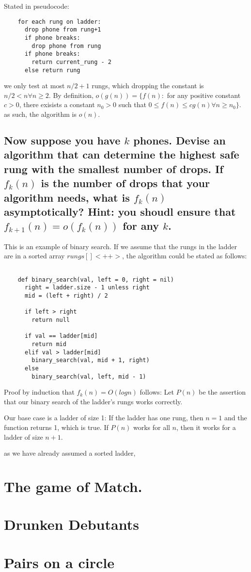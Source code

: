 \documentclass[titlepage]{article}\usepackage[]{graphicx}\usepackage[]{color}
\begin{document}
  Stated in pseudocode:
  \begin{lstlisting}
	for each rung on ladder:
	  drop phone from rung+1
	  if phone breaks:
		drop phone from rung
	  if phone breaks:
		return current_rung - 2
	  else return rung
  \end{lstlisting}
  we only test at most $n/2+1$ rungs, which dropping the constant is $ n/2 < n
  \forall n \geq 2$. 
  By definition, $o(g(n)) = \{ f(n) : $ for any positive constant $c>0$, there
  exisists a constant $n_0 > 0$ such that $0 \leq f(n) \leq cg(n) \forall n \geq n_0\}$.
  as such, the algorithm is $o(n)$. 

\subsection{Now suppose you have $k$ phones. Devise an algorithm that can
  determine the highest safe rung with the smallest number of drops. If
  $f_k(n)$
  is the number of drops that your algorithm needs, what is 
  $f_k(n)$ asymptotically? Hint: you shoudl ensure that 
  $f_{k+1}(n) = o(f_k(n))$ for any $k$.}

  This is an example of binary search. If we assume that the rungs in the
  ladder are in a sorted array $rungs[]<++>$, the algorithm could be stated
  as follows:

  \begin{lstlisting}

	def binary_search(val, left = 0, right = nil)
	  right = ladder.size - 1 unless right
	  mid = (left + right) / 2
 
	  if left > right
	  	return null
   
	  if val == ladder[mid]
		return mid
	  elif val > ladder[mid]
		binary_search(val, mid + 1, right)
	  else
		binary_search(val, left, mid - 1)

  \end{lstlisting}

  Proof by induction that $f_k(n) = O(log n)$ follows:
  Let $P(n)$ be the assertion that our binary search of the ladder's rungs
  works correctly. 

  Our base case is a ladder of size 1: If the ladder has one rung, then
  $n=1$ and the function returns 1, which is true. 
  If $P(n)$ works for all $n$, then it works for a ladder of size $n+1$. 

  as we have already assumed a sorted ladder,




  \section{ The game of Match. }







  \section{ Drunken Debutants}



  \section{ Pairs on a circle}


  
\end{document}

